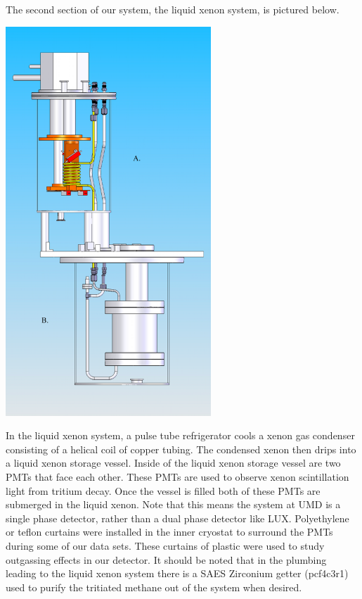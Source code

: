\documentclass[a4paper,12pt]{article}
\begin{document}
The second section of our system, the liquid xenon system, is pictured below.

\begin{center}
\includegraphics[scale=0.75]{cryo.png}
\end{center}

In the liquid xenon system, a pulse tube refrigerator cools a xenon gas condenser consisting of a helical coil of copper tubing.  The condensed xenon then drips into a liquid xenon storage vessel.  Inside of the liquid xenon storage vessel are two PMTs that face each other. These PMTs are used to observe xenon scintillation light from tritium decay. Once the vessel is filled both of these PMTs are submerged in the liquid xenon.  Note that this means the system at UMD is a single phase detector, rather than a dual phase detector like LUX.  Polyethylene or teflon curtains were installed in the inner cryostat to surround the PMTs during some of our data sets.  These curtains of plastic were used to study outgassing effects in our detector.  It should be noted that in the plumbing leading to the liquid xenon system there is a SAES Zirconium getter (pcf4c3r1) used to purify the tritiated methane out of the system when desired.
\end{document}
